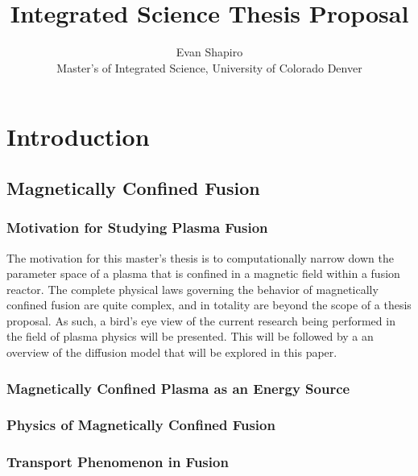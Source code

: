 \documentclass{article}
\title{Integrated Science Thesis Proposal}
\author{Evan Shapiro \\ Master's of Integrated Science, University of Colorado Denver}
\begin{document}
\maketitle
\tableofcontents
\section{Introduction}
\subsection{Magnetically Confined Fusion}
\subsubsection{Motivation for Studying Plasma Fusion}
The motivation for this master's thesis is to computationally narrow down the parameter space of a plasma that is confined in a magnetic field within a fusion reactor.
The complete physical laws governing the behavior of magnetically confined fusion are quite complex, and in totality are beyond the scope of a thesis proposal. 
As such, a bird's eye view of the current research being performed in the field of plasma physics will be presented. \cite{J_Friedberg:1}
This will be followed by a an overview of the diffusion model that will be explored in this paper.\\
\subsubsection{Magnetically Confined Plasma as an Energy Source}
\subsubsection{Physics of Magnetically Confined Fusion}
\subsubsection{Transport Phenomenon in Fusion}


\newpage



\end{document}
